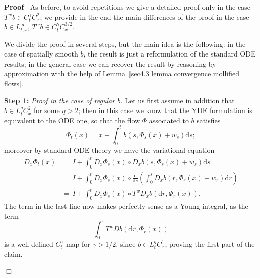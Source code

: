 \documentclass[10pt]{article}
\newcommand{\mathd}{\mathrm{d}}
\newcommand{\tmstrong}[1]{\textbf{#1}}
\newcommand{\tmtextit}[1]{{\itshape{#1}}}
\newenvironment{proof}{\noindent\textbf{Proof\ }}{\hspace*{\fill}$\Box$\medskip}
\begin{document}
\begin{proof}
  As before, to avoid repetitions we give a detailed proof only in the case
  $T^w b \in C^{\gamma}_t C^2_x$; we provide in the end the main differences
  of the proof in the case $b \in L^{\infty}_{t, x}$, $T^w b \in C^{\gamma}_t
  C^{3 / 2}_x$.
  
  We divide the proof in several steps, but the main idea is the following: in
  the case of spatially smooth $b$, the result is just a reformulation of the
  standard ODE results; in the general case we can recover the result by
  reasoning by approximation with the help of Lemma~\ref{sec4.3 lemma
  convergence mollified flows}.
  
  {\tmstrong{Step 1:}} \tmtextit{Proof in the case of regular $b$.} Let us
  first assume in addition that $b \in L^q_t C_x^2$ for some $q > 2$; then in
  this case we know that the YDE formulation is equivalent to the ODE one, so
  that the flow $\Phi$ associated to $b$ satisfies
  \[ \Phi_t (x) = x + \int_0^t b (s, \Phi_s (x) + w_s) \mathd s ; \]
  moreover by standard ODE theory we have the variational equation
%  
  \begin{align*}
    D_x \Phi_t (x) & = \, I + \int_0^t D_x \Phi_s (x) \circ D_x b (s, \Phi_s
    (x) + w_s) \mathd s\\
    & = \, I + \int_0^t D_x \Phi_s (x) \circ \frac{\mathd}{\mathd s} \left(
    \int_0^s D_x b (r, \Phi_r (x) + w_r) \mathd r \right)\\
    & = \, I + \int_0^t D_x \Phi_s (x) \circ T^w D_x b (\mathd r, \Phi_r (x))
    .
  \end{align*}
%  
  The term in the last line now makes perfectly sense as a Young integral, as
  the term
  \[ \int_0^{\cdot} T^w D b (\mathd r, \Phi_r (x)) \]
  is a well defined $C_t^{\gamma}$ map for $\gamma > 1 / 2$, since $b \in
  L^q_t C^1_x$, proving the first part of the claim.
  

\end{proof}
\end{document}
